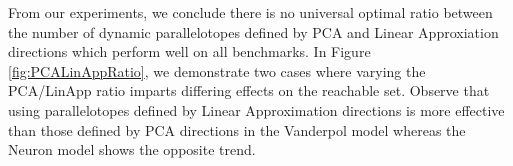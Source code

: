 
From our experiments, we conclude there is no universal optimal ratio between the number of dynamic parallelotopes defined by PCA and Linear Approxiation directions which perform well on all benchmarks. In Figure \ref{fig:PCALinAppRatio}, we demonstrate two cases where varying the PCA/LinApp ratio imparts differing effects on the reachable set.  Observe that using parallelotopes defined by Linear Approximation directions is more effective than those defined by PCA directions in the Vanderpol model whereas the Neuron model shows the opposite trend.

